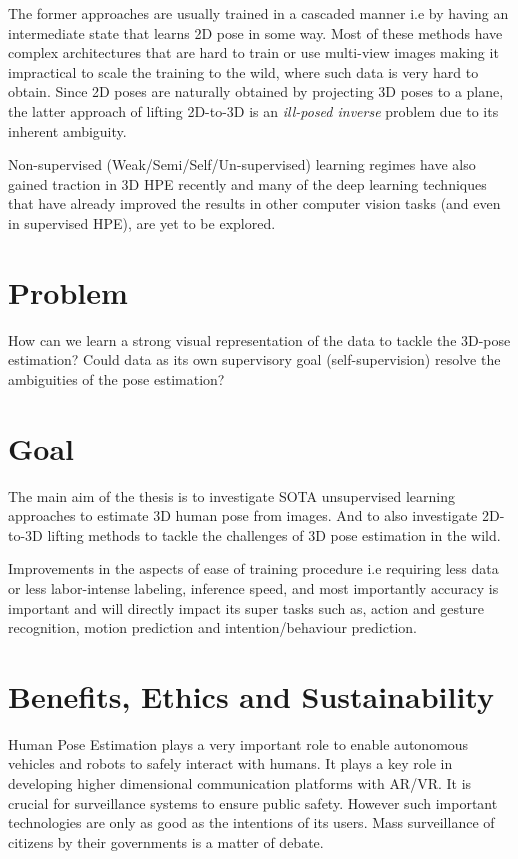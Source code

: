 The former approaches are usually trained in a cascaded manner i.e by having an intermediate state that learns 2D pose in some way. Most of these methods have complex architectures that are hard to train or use multi-view images making it impractical to scale the training to the wild, where such data is very hard to obtain. Since 2D poses are naturally obtained by projecting 3D poses to a plane, the latter approach of lifting 2D-to-3D is an \textit{ill-posed inverse} problem due to its inherent ambiguity. 

Non-supervised (Weak/Semi/Self/Un-supervised) learning regimes have also gained traction in 3D HPE recently and many of the deep learning techniques that have already improved the results in other computer vision tasks (and even in supervised \ac{HPE}), are yet to be explored. 

\section{Problem}
How can we learn a strong visual representation of the data to tackle the 3D-pose estimation? Could data as its own supervisory goal (self-supervision) resolve the ambiguities of the pose estimation?


\section{Goal}

The main aim of the thesis is to investigate \ac{SOTA} unsupervised learning approaches to estimate 3D human pose from images. And to also investigate 2D-to-3D lifting methods to tackle the challenges of 3D pose estimation in the wild. 

Improvements in the aspects of ease of training procedure i.e requiring less data or less labor-intense labeling, inference speed, and most importantly accuracy is important and will directly impact its super tasks such as, action and gesture recognition, motion prediction and intention/behaviour prediction.

\section{Benefits, Ethics and Sustainability}
Human Pose Estimation plays a very important role to enable autonomous vehicles and robots to safely interact with humans. It plays a key role in developing higher dimensional communication platforms with \ac{AR/VR}. It is crucial for surveillance systems to ensure public safety. However such important technologies are only as good as the intentions of its users. Mass surveillance of citizens by their governments is a matter of debate.  

